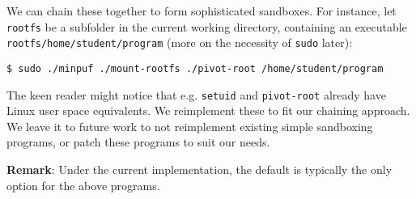 We can chain these together to form sophisticated sandboxes. For instance, let
\texttt{rootfs} be a subfolder in the current working directory, containing an
executable \texttt{rootfs/home/student/program} (more on the necessity of
\texttt{sudo} later):

\begin{lstlisting}
$ sudo ./minpuf ./mount-rootfs ./pivot-root /home/student/program
\end{lstlisting}

The keen reader might notice that e.g. \texttt{setuid} and \texttt{pivot-root}
already have Linux user space equivalents. We reimplement these to fit our
chaining approach. We leave it to future work to not reimplement existing
simple sandboxing programs, or patch these programs to suit our needs.

\textbf{Remark}: Under the current implementation, the default is typically the
only option for the above programs.
